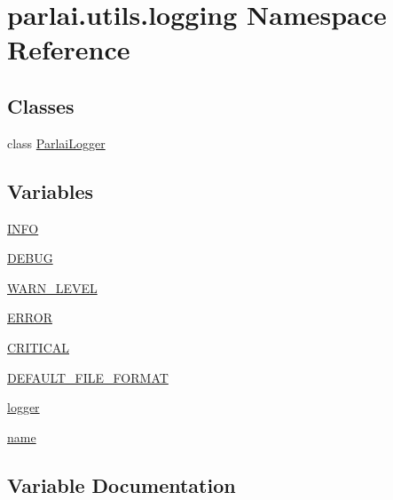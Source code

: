 \hypertarget{namespaceparlai_1_1utils_1_1logging}{}\section{parlai.\+utils.\+logging Namespace Reference}
\label{namespaceparlai_1_1utils_1_1logging}
\subsection*{Classes}
\begin{DoxyCompactItemize}
\item 
class \hyperlink{classparlai_1_1utils_1_1logging_1_1ParlaiLogger}{Parlai\+Logger}
\end{DoxyCompactItemize}
\subsection*{Variables}
\begin{DoxyCompactItemize}
\item 
\hyperlink{namespaceparlai_1_1utils_1_1logging_a4bc2de74317465e5d1a8b5d7b913d48a}{I\+N\+FO}
\item 
\hyperlink{namespaceparlai_1_1utils_1_1logging_ab324194e88a7aab20579ec176d8e47ed}{D\+E\+B\+UG}
\item 
\hyperlink{namespaceparlai_1_1utils_1_1logging_afec7af7cd10ea4f525100666308d8bec}{W\+A\+R\+N\+\_\+\+L\+E\+V\+EL}
\item 
\hyperlink{namespaceparlai_1_1utils_1_1logging_a5b52734ed566f29c71aed8c182ae635c}{E\+R\+R\+OR}
\item 
\hyperlink{namespaceparlai_1_1utils_1_1logging_a62c2f00eeb086c49df5c01f9ed2f7063}{C\+R\+I\+T\+I\+C\+AL}
\item 
\hyperlink{namespaceparlai_1_1utils_1_1logging_a4f0bd70ca70d1f55afc8a475cc7a6d3b}{D\+E\+F\+A\+U\+L\+T\+\_\+\+F\+I\+L\+E\+\_\+\+F\+O\+R\+M\+AT}
\item 
\hyperlink{namespaceparlai_1_1utils_1_1logging_ab73f941d285f8581d5e81540f5600a98}{logger}
\item 
\hyperlink{namespaceparlai_1_1utils_1_1logging_a14596a213d7a65110cdb559e42d6739b}{name}
\end{DoxyCompactItemize}


\subsection{Variable Documentation}
\mbox{\label{namespaceparlai_1_1utils_1_1logging_a62c2f00eeb086c49df5c01f9ed2f7063}} 

